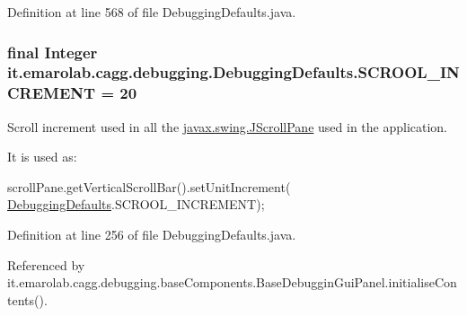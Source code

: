 Definition at line 568 of file Debugging\-Defaults.\-java.

\hypertarget{classit_1_1emarolab_1_1cagg_1_1debugging_1_1DebuggingDefaults_af6ac0641daa3d8979c1a4f0254efd2ac}{
\subsubsection[{S\-C\-R\-O\-O\-L\-\_\-\-I\-N\-C\-R\-E\-M\-E\-N\-T}]{\setlength{\rightskip}{0pt plus 5cm}final Integer it.\-emarolab.\-cagg.\-debugging.\-Debugging\-Defaults.\-S\-C\-R\-O\-O\-L\-\_\-\-I\-N\-C\-R\-E\-M\-E\-N\-T = 20\hspace{0.3cm}{\ttfamily [static]}}}\label{classit_1_1emarolab_1_1cagg_1_1debugging_1_1DebuggingDefaults_af6ac0641daa3d8979c1a4f0254efd2ac}
Scroll increment used in all the \hyperlink{}{javax.\-swing.\-J\-Scroll\-Pane} used in the application.\par
 It is used as\-:
\begin{DoxyCode}
scrollPane.getVerticalScrollBar().setUnitIncrement( \hyperlink{classit_1_1emarolab_1_1cagg_1_1debugging_1_1DebuggingDefaults_a81e9d969acbd6a275df16e3e53f3440e}{DebuggingDefaults}.SCROOL\_INCREMENT); 
\end{DoxyCode}
 

Definition at line 256 of file Debugging\-Defaults.\-java.



Referenced by it.\-emarolab.\-cagg.\-debugging.\-base\-Components.\-Base\-Debuggin\-Gui\-Panel.\-initialise\-Contents().

